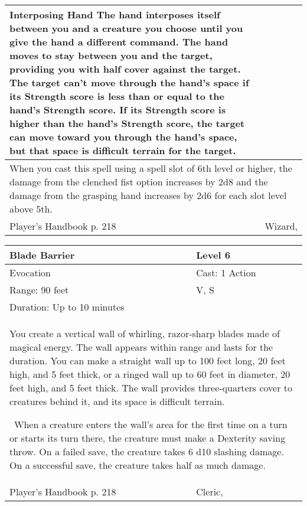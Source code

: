 \documentclass[11pt]{report}
\begin{document}
\begin{table}[H]
\begin{tabular}{||p{6cm}|p{6cm}||}
{Interposing Hand
The hand interposes itself between you and a creature you choose until you give the hand a different command. The hand moves to stay between you and the target, providing you with half cover against the target. The target can’t move through the hand’s space if its Strength score is less than or equal to the hand’s Strength score. If its Strength score is higher than the hand’s Strength score, the target can move toward you through the hand’s space, but that space is difficult terrain for the target.}\\ \hline
		\multicolumn{2}{||p{12cm}||}{When you cast this spell using a spell slot of 6th level or higher, the damage from the clenched fist option increases by 2d8 and the damage from the grasping hand increases by 2d6 for each slot level above 5th.}\\ \hline
Player's Handbook p. 218 & Wizard, \\ \hline\hline
	\end{tabular}
\end{table}

\begin{table}[H]
	\begin{tabular}{||p{6cm}|p{6cm}||}
		\hline\hline
		\bf{Blade Barrier} & Level 6\\ \hline
		Evocation & Cast: 1 Action\\ \hline
		Range: 90 feet & V, S\\ \hline
		Duration: Up to 10 minutes & \\ \hline
		\multicolumn{2}{||p{12cm}||}{You create a vertical wall of whirling, razor-sharp blades made of magical energy. The wall appears within range and lasts for the duration. You can make a straight wall up to 100 feet long, 20 feet high, and 5 feet thick, or a ringed wall up to 60 feet in diameter, 20 feet high, and 5 feet thick. The wall provides three-quarters cover to creatures behind it, and its space is difficult terrain. 

 When a creature enters the wall’s area for the first time on a turn or starts its turn there, the creature must make a Dexterity saving throw. On a failed save, the creature takes 6 d10 slashing damage. On a successful save, the creature takes half as much damage.}\\ \hline
Player's Handbook p. 218 & Cleric, \\ \hline\hline
	\end{tabular}
\end{table}
\end{document}
